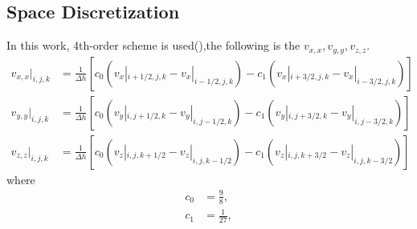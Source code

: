 \subsection{Space Discretization} 
In this work, 4th-order scheme is used(\cite{graves1996simulating}),the following is the $v_{x,x},v_{y,y},v_{z,z}$.
\begin{subequations}
\begin{align}
	v_{x,x}|_{i,j,k} &= \frac{1}{\Delta h}[c_0(v_x|_{i+1/2,j,k}-v_x|_{i-1/2,j,k})-c_1(v_x|_{i+3/2,j,k}-v_x|_{i-3/2,j,k})] \\
	v_{y,y}|_{i,j,k} &= \frac{1}{\Delta h}[c_0(v_y|_{i,j+1/2,k}-v_y|_{i,j-1/2,k})-c_1(v_y|_{i,j+3/2,k}-v_y|_{i,j-3/2,k})] \\
	v_{z,z}|_{i,j,k} &= \frac{1}{\Delta h}[c_0(v_z|_{i,j,k+1/2}-v_z|_{i,j,k-1/2})-c_1(v_z|_{i,j,k+3/2}-v_z|_{i,j,k-3/2})] 
\end{align}
\end{subequations}
where
\begin{subequations}
\begin{align}
	c_0 &= \frac{9}{8}, \\
	c_1 &= \frac{1}{27},
\end{align}
\end{subequations}